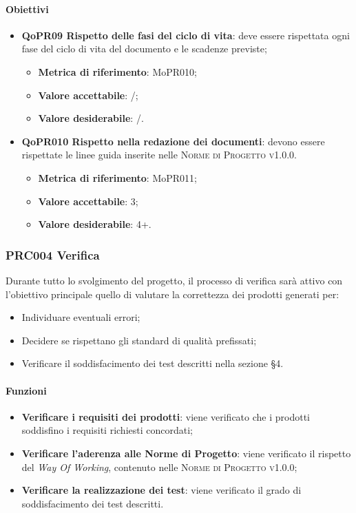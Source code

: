 \documentclass[../piano-di-qualifica.tex]{subfiles}
\begin{document}
\paragraph{Obiettivi}
\label{sub:obiettivi_3}
\begin{itemize}
    \item \textbf{QoPR09 Rispetto delle fasi del ciclo di vita}: deve essere rispettata ogni fase del ciclo di vita del documento e le scadenze previste;
        \begin{itemize}
            \item \textbf{Metrica di riferimento}: MoPR010;
            \item \textbf{Valore accettabile}: /; %
            \item \textbf{Valore desiderabile}: /.
        \end{itemize}
    \item \textbf{QoPR010 Rispetto nella redazione dei documenti}: devono essere rispettate le linee guida inserite nelle \textsc{Norme di Progetto v1.0.0}.
        \begin{itemize}
            \item \textbf{Metrica di riferimento}: MoPR011;
            \item \textbf{Valore accettabile}: 3; %
            \item \textbf{Valore desiderabile}: 4+.
        \end{itemize}
\end{itemize}

\subsubsection{PRC004 Verifica}
\label{sub:produzione_dei_documenti}
Durante tutto lo svolgimento del progetto, il processo di verifica sarà attivo con l'obiettivo principale quello di valutare la correttezza dei prodotti generati per: 
\begin{itemize}
    \item Individuare eventuali errori;
    \item Decidere se rispettano gli standard di qualità prefissati;
    \item Verificare il soddisfacimento dei test descritti nella sezione §4.
\end{itemize}

\paragraph{Funzioni}
\label{sub:funzioni_4}
\begin{itemize}
    \item \textbf{Verificare i requisiti dei prodotti}: viene verificato che i prodotti soddisfino i requisiti richiesti concordati;
    \item \textbf{Verificare l'aderenza alle Norme di Progetto}: viene verificato il rispetto del \textit{Way Of Working}, contenuto nelle \textsc{Norme di Progetto v1.0.0};
    \item \textbf{Verificare la realizzazione dei test}: viene verificato il grado di soddisfacimento dei test descritti.
\end{itemize}
\end{document}
